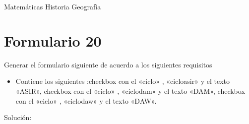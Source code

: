 \documentclass[letterpaper,10pt,spanish]{sphinxmanual}
\begin{document}
\begin{sphinxVerbatim}[commandchars=\\\{\}]
      Matemáticas 
      Historia 
      Geografía 
\end{sphinxVerbatim}


\section{Formulario 20}
\label{\detokenize{ejercicios/formularios/anexo_formularios:formulario-20}}
Generar el formulario siguiente de acuerdo a los siguientes requisitos
\begin{itemize}
\item {} 
Contiene los siguientes :checkbox con el   «ciclo» ,   «cicloasir»  y el texto «ASIR», checkbox con el   «ciclo» ,   «ciclodam»  y el texto «DAM», checkbox con el   «ciclo» ,   «ciclodaw»  y el texto «DAW».

\end{itemize}


Solución:
\end{document}
